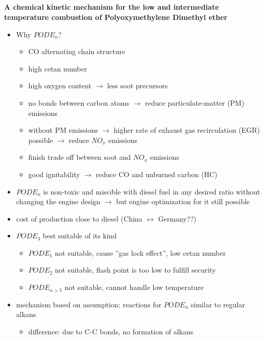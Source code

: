 \documentclass[12pt,oneside,a4paper,english]{article}
\begin{document}
\subsection{\cite{He2018}} %
\textbf{A chemical kinetic mechanism for the low and intermediate temperature combustion of Polyoxymethylene Dimethyl ether}

\begin{itemize}
\item{Why $PODE_n$?}

	\begin{itemize}
	\item{CO alternating chain structure}
	\item{high cetan number}
	\item{high oxygen content $\rightarrow$ less soot precursors}
	\item{no bonds between carbon atoms $\rightarrow$ reduce particulate-matter (PM) emissions}
	\item{without PM emissions $\rightarrow$ higher rate of exhaust gas recirculation (EGR) possible $\rightarrow$ reduce $NO_x$ emissions}
	\item{finish trade off between soot and $NO_x$ emissions }
	\item{good ignitability $\rightarrow$ reduce CO and unburned carbon (HC)}
	\end{itemize}
	
\item{$PODE_n$ is non-toxic and miscible with diesel fuel in any desired ratio without changing the engine design $\rightarrow$ but engine optimization for it still possible}
\item{cost of production close to diesel (China $\leftrightarrow$ Germany??)}
\item{$PODE_3$ best suitable of its kind}

	\begin{itemize}
	\item{$PODE_1$ not suitable, cause ''gas lock effect'', low cetan number}
	\item{$PODE_2$ not suitable, flash point is too low to fulfill security}
	\item{$PODE_{n>5}$ not suitable, cannot handle low temperature}
	\end{itemize}
	
\item{mechanism based on assumption: reactions for $PODE_n$ similar to regular alkans}

	\begin{itemize}
	\item{difference: due to C-C bonds, no formation of alkans}
	\end{itemize}


\end{itemize}
\end{document}
